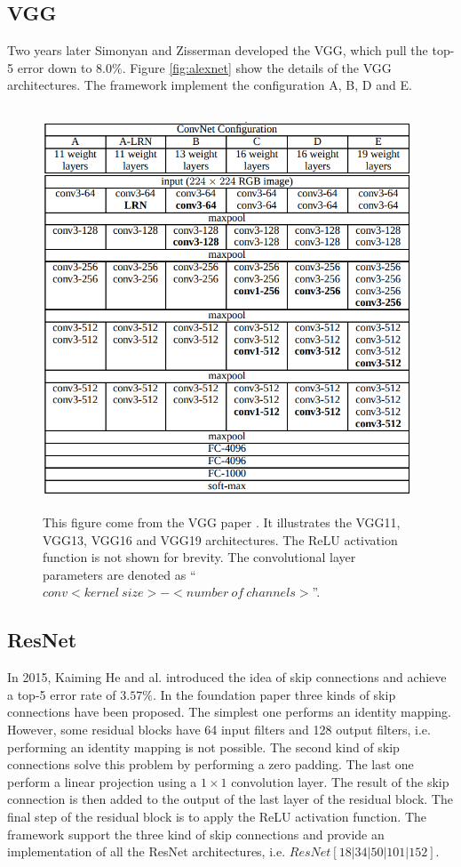 \documentclass[11pt]{report}
\begin{document}
\newpage
\subsection{VGG}

Two years later Simonyan and Zisserman \cite{DBLP:journals/corr/RussakovskyDSKSMHKKBBF14} developed the VGG, which pull the top-5 error down to $8.0\%$. Figure \ref{fig:alexnet} show the details of the VGG architectures. The framework implement the configuration A, B, D and E.

\begin{figure}[h]
\centering
\includegraphics[width=11cm, height=12cm]{vgg}
\caption[VGG architectures]{This figure come from the VGG paper \cite{DBLP:journals/corr/RussakovskyDSKSMHKKBBF14}. It illustrates the VGG11, VGG13, VGG16 and VGG19 architectures. The ReLU activation function is not shown for brevity. The convolutional layer parameters are denoted as ``$conv<kernel\ size>-<number\ of\ channels>$''.}
\label{fig:vgg}
\end{figure}

\newpage
\subsection{ResNet}

In 2015, Kaiming He and al. \cite{DBLP:conf/cvpr/HeZRS16} introduced the idea of skip connections and achieve a top-5 error rate of $3.57\%$. In the foundation paper three kinds of skip connections have been proposed. The simplest one performs an identity mapping. However, some residual blocks have 64 input filters and 128 output filters, i.e. performing an identity mapping is not possible. The second kind of skip connections solve this problem by performing a zero padding. The last one perform a linear projection using a $1\times1$ convolution layer. The result of the skip connection is then added to the output of the last layer of the residual block. The final step of the residual block is to apply the ReLU activation function. The framework support the three kind of skip connections and provide an implementation of all the ResNet architectures, i.e. $ResNet[18|34|50|101|152]$.
\end{document}
